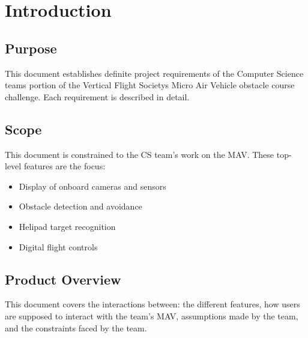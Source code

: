 \documentclass[onecolumn, oneside, letterpaper, draftclsnofoot, 10pt, compsoc]{IEEEtran}
\begin{document}
\begin{titlepage}
\begin{singlespace}
\begin{abstract}
        Oregon State University (OSU) is participating in this year\textquotesingle s Mirco Air Vehicle Challenge (MAV) hosted by the Vertical Flight Society (VFS). The VFS hosts the annual MAV Challenge to attract interest from future scientists and engineers, and to promote vertical flight technology. OSU\textquotesingle s team is comprised of Mechanical Engineers, Electrical and Computer Engineers, and Computer Scientists. This document covers the expected functionality of OSU\textquotesingle s MAV software, developed and written by the team\textquotesingle s Computer Scientists, upon delivery in Spring 2019.
        \end{abstract}
    \end{singlespace}
\end{titlepage}
\newpage
{}
\tableofcontents
\listoffigures
\clearpage

\section{Introduction}

\subsection{Purpose}
This document establishes definite project requirements of the Computer Science team\textquotesingle s portion of the Vertical Flight Society\textquotesingle s Micro Air Vehicle obstacle course challenge. Each requirement is described in detail.

\subsection{Scope}
This document is constrained to the CS team’s work on the MAV. These top-level features are the focus:
\begin{itemize}
    \item Display of onboard cameras and sensors
    \item Obstacle detection and avoidance
    \item Helipad target recognition
    \item Digital flight controls
\end{itemize}

\subsection{Product Overview}
This document covers the interactions between: the different features, how users are supposed to interact with the team’s MAV, assumptions made by the team, and the constraints faced by the team.
\end{document}
